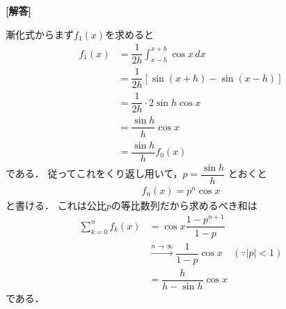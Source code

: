 \documentclass[../../main.tex]{subfiles}
\begin{document}
\begin{oframed}
  
\end{oframed}

{\bf [解答]}

漸化式からまず$f_1(x)$を求めると
\begin{align}
  f_1(x)
  &= \dfrac{1}{2h} \int_{x-h}^{x+h} \cos x \, dx \\
  &= \dfrac{1}{2h} [\sin(x+h) - \sin(x-h)] \\
  &= \dfrac{1}{2h} \cdot 2\sin h \cos x \\
  &= \dfrac{\sin h}{h} \cos x \\
  &= \dfrac{\sin h}{h} f_0(x)
\end{align}
である．
従ってこれをくり返し用いて，$p = \dfrac{\sin h}{h}$ とおくと
\begin{align}
  f_n(x) = p^n \cos x
\end{align}
と書ける．
これは公比$p$の等比数列だから求めるべき和は
\begin{align}
  \sum_{k=0}^n f_k(x)
  &= \cos x \dfrac{1 - p^{n+1}}{1 - p} \\
  &\xrightarrow{n \to \infty} \dfrac{1}{1 - p} \cos x \quad (\because |p| < 1) \\
  &= \dfrac{h}{h - \sin h} \cos x
\end{align}
である．

\newpage
\end{document}
